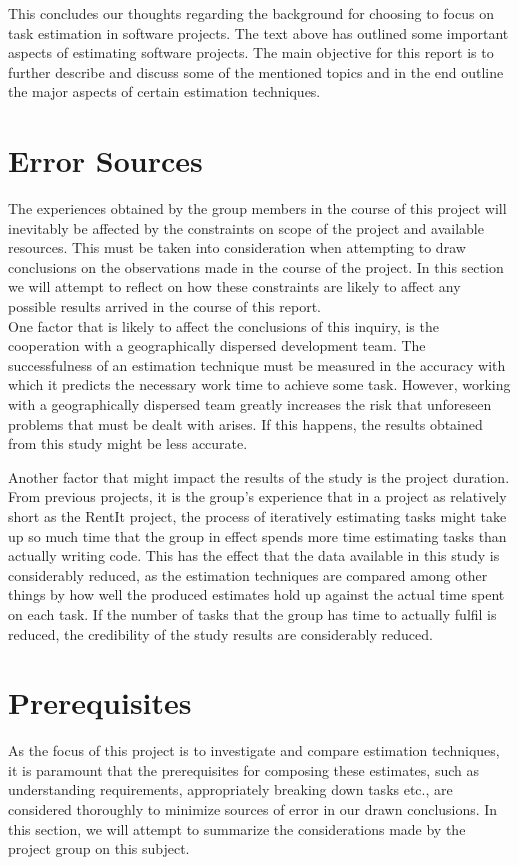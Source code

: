 This concludes our thoughts regarding the background for choosing to focus on task estimation in software projects. The text above has outlined some important aspects of estimating software projects. The main objective for this report is to further describe and discuss some of the mentioned topics and in the end outline the major aspects of certain estimation techniques.

\section{Error Sources}
The experiences obtained by the group members in the course of this project will inevitably be affected by the constraints on scope of the project and available resources. This must be taken into consideration when attempting to draw conclusions on the observations made in the course of the project. In this section we will attempt to reflect on how these constraints are likely to affect any possible results arrived in the course of this report.\\
One factor that is likely to affect the conclusions of this inquiry, is the cooperation with a geographically dispersed development team. The successfulness of an estimation technique must be measured in the accuracy with which it predicts the necessary work time to achieve some task. However, working with a geographically dispersed team greatly increases the risk that unforeseen problems that must be dealt with arises. If this happens, the results obtained from this study might be less accurate.

Another factor that might impact the results of the study is the project duration. From previous projects, it is the group's experience that in a project as relatively short as the RentIt project, the process of iteratively estimating tasks might take up so much time that the group in effect spends more time estimating tasks than actually writing code. This has the effect that the data available in this study is considerably reduced, as the estimation techniques are compared among other things by how well the produced estimates hold up against the actual time spent on each task. If the number of tasks that the group has time to actually fulfil is reduced, the credibility of the study results are considerably reduced.

\section{Prerequisites}
As the focus of this project is to investigate and compare estimation techniques, it is paramount that the prerequisites for composing these estimates, such as understanding requirements, appropriately breaking down tasks etc., are considered thoroughly to minimize sources of error in our drawn conclusions. In this section, we will attempt to summarize the considerations made by the project group on this subject.

